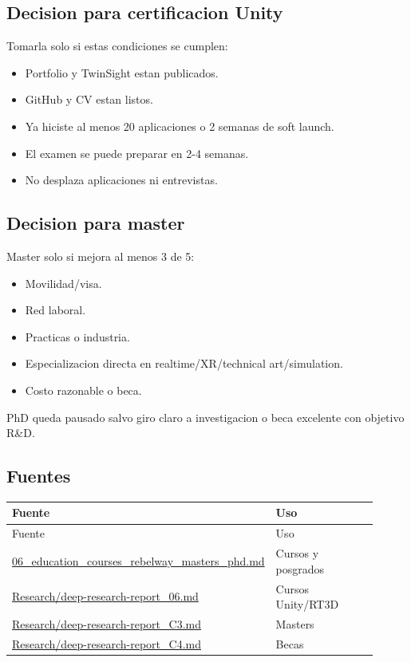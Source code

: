 \subsection{Decision para certificacion Unity}


Tomarla solo si estas condiciones se cumplen:


\begin{itemize}
\item Portfolio y TwinSight estan publicados.
\item GitHub y CV estan listos.
\item Ya hiciste al menos 20 aplicaciones o 2 semanas de soft launch.
\item El examen se puede preparar en 2-4 semanas.
\item No desplaza aplicaciones ni entrevistas.
\end{itemize}


\subsection{Decision para master}


Master solo si mejora al menos 3 de 5:


\begin{itemize}
\item Movilidad/visa.
\item Red laboral.
\item Practicas o industria.
\item Especializacion directa en realtime/XR/technical art/simulation.
\item Costo razonable o beca.
\end{itemize}


PhD queda pausado salvo giro claro a investigacion o beca excelente con objetivo R\&D.


\subsection{Fuentes}


\begin{center}
\scriptsize
\begin{longtable}{>{\raggedright\arraybackslash}p{0.455\linewidth} >{\raggedright\arraybackslash}p{0.455\linewidth}}
\toprule
Fuente & Uso \\
\midrule
\endfirsthead
\toprule
Fuente & Uso \\
\midrule
\endhead
\href{file:///E:/Laboral/06_education_courses_rebelway_masters_phd.md}{06\_education\_courses\_rebelway\_masters\_phd.md} & Cursos y posgrados \\
\href{file:///E:/Laboral/Research/deep-research-report_06.md}{Research/deep-research-report\_06.md} & Cursos Unity/RT3D \\
\href{file:///E:/Laboral/Research/deep-research-report_C3.md}{Research/deep-research-report\_C3.md} & Masters \\
\href{file:///E:/Laboral/Research/deep-research-report_C4.md}{Research/deep-research-report\_C4.md} & Becas \\
\bottomrule
\end{longtable}
\end{center}
